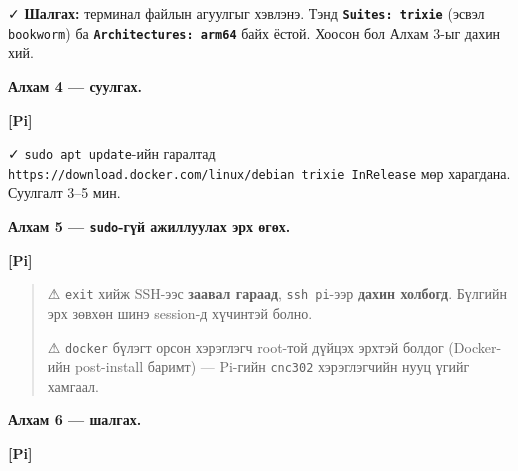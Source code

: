 ✓ \textbf{Шалгах:} терминал файлын агуулгыг хэвлэнэ. Тэнд \textbf{\texttt{Suites:\ trixie}} (эсвэл \texttt{bookworm}) ба \textbf{\texttt{Architectures:\allowbreak{}\ arm64}} байх ёстой. Хоосон бол Алхам 3-ыг дахин хий.

\textbf{Алхам 4 --- суулгах.}

\textbf{{[}Pi{]}}

\begin{Shaded}
\begin{Highlighting}[]
\end{Highlighting}
\end{Shaded}

✓ \texttt{sudo\ apt\ update}-ийн гаралтад \texttt{https:\allowbreak{}/\allowbreak{}/\allowbreak{}download.\allowbreak{}docker.\allowbreak{}com/\allowbreak{}linux/\allowbreak{}debian\ trixie\ InRelease} мөр харагдана. Суулгалт 3--5 мин.

\textbf{Алхам 5 --- \texttt{sudo}-гүй ажиллуулах эрх өгөх.}

\textbf{{[}Pi{]}}

\begin{Shaded}
\begin{Highlighting}[]
\end{Highlighting}
\end{Shaded}

\begin{quote}
⚠ \texttt{exit} хийж SSH-ээс \textbf{заавал гараад}, \texttt{ssh\ pi}-ээр \textbf{дахин холбогд}. Бүлгийн эрх зөвхөн шинэ session-д хүчинтэй болно.

⚠ \texttt{docker} бүлэгт орсон хэрэглэгч root-той дүйцэх эрхтэй болдог (Docker-ийн post-install баримт) --- Pi-гийн \texttt{cnc302} хэрэглэгчийн нууц үгийг хамгаал.
\end{quote}

\textbf{Алхам 6 --- шалгах.}

\textbf{{[}Pi{]}}

\begin{Shaded}
\begin{Highlighting}[]
\end{Highlighting}
\end{Shaded}


